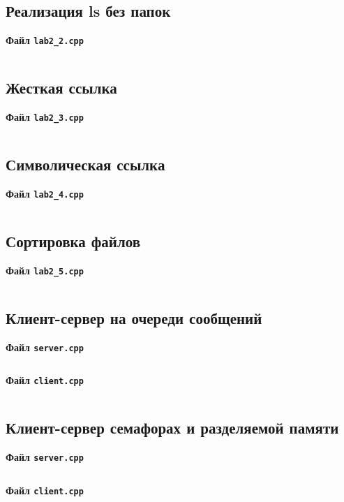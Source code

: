 \documentclass[a4paper,14pt]{extarticle}
\begin{document}
\subsection{Реализация ls без папок}\label{code:lab2_2}
\centerline{\textbf{Файл \texttt{lab2\_2.cpp}}}

\inputminted{octave}{lab22.cpp}

\subsection{Жесткая ссылка}\label{code:lab2_3}
\centerline{\textbf{Файл \texttt{lab2\_3.cpp}}}

\inputminted{octave}{lab23.cpp}

\subsection{Символическая ссылка}\label{code:lab2_4}
\centerline{\textbf{Файл \texttt{lab2\_4.cpp}}}

\inputminted{octave}{lab24.cpp}

\subsection{Сортировка файлов}\label{code:lab2_5}
\centerline{\textbf{Файл \texttt{lab2\_5.cpp}}}

\inputminted{octave}{lab25.cpp}

\subsection{Клиент-сервер на очереди сообщений}\label{code:lab3_1}
\centerline{\textbf{Файл \texttt{server.cpp}}}

\inputminted{octave}{server31.cpp}

\centerline{\textbf{Файл \texttt{client.cpp}}}

\inputminted{octave}{client31.cpp}

\subsection{Клиент-сервер семафорах и разделяемой памяти}\label{code:lab3_2}
\centerline{\textbf{Файл \texttt{server.cpp}}}

\inputminted{octave}{server32.cpp}

\centerline{\textbf{Файл \texttt{client.cpp}}}

\inputminted{octave}{client32.cpp}
\end{document}
